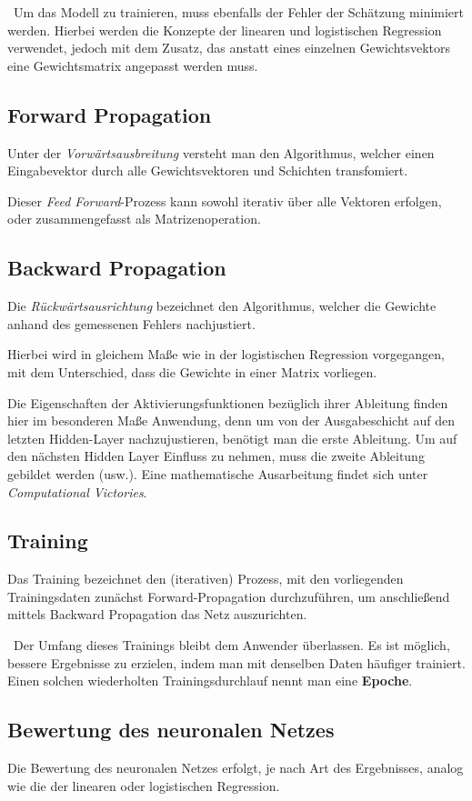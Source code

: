 ~\newline Um das Modell zu trainieren, muss ebenfalls der Fehler der Schätzung minimiert werden. Hierbei werden die Konzepte der linearen und logistischen Regression verwendet, jedoch mit dem Zusatz, das anstatt eines einzelnen Gewichtsvektors eine Gewichtsmatrix angepasst werden muss. 
\subsection{Forward Propagation}
Unter der \textit{Vorwärtsausbreitung} versteht man den Algorithmus, welcher einen Eingabevektor durch alle Gewichtsvektoren und Schichten transfomiert. 

Dieser \textit{Feed Forward}-Prozess kann sowohl iterativ über alle Vektoren erfolgen, oder zusammengefasst als Matrizenoperation.
\subsection{Backward Propagation}
Die \textit{Rückwärtsausrichtung} bezeichnet den Algorithmus, welcher die Gewichte anhand des gemessenen Fehlers nachjustiert. 

Hierbei wird in gleichem Maße wie in der logistischen Regression vorgegangen, mit dem Unterschied, dass die Gewichte in einer Matrix vorliegen. 

Die Eigenschaften der Aktivierungsfunktionen bezüglich ihrer Ableitung finden hier im besonderen Maße Anwendung, denn um von der Ausgabeschicht auf den letzten Hidden-Layer nachzujustieren, benötigt man die erste Ableitung. Um auf den nächsten Hidden Layer Einfluss zu nehmen, muss die zweite Ableitung gebildet werden (usw.). Eine mathematische Ausarbeitung findet sich unter \cite{colah} \textit{Computational Victories}.
\subsection{Training}
Das Training bezeichnet den (iterativen) Prozess, mit den vorliegenden Trainingsdaten zunächst Forward-Propagation durchzuführen, um anschließend mittels Backward Propagation das Netz auszurichten. 

~\newline Der Umfang dieses Trainings bleibt dem Anwender überlassen. Es ist möglich, bessere Ergebnisse zu erzielen, indem man mit denselben Daten häufiger trainiert. Einen solchen wiederholten Trainingsdurchlauf nennt man eine \textbf{Epoche}. 
\subsection{Bewertung des neuronalen Netzes}
Die Bewertung des neuronalen Netzes erfolgt, je nach Art des Ergebnisses, analog wie die der linearen oder logistischen Regression. 
